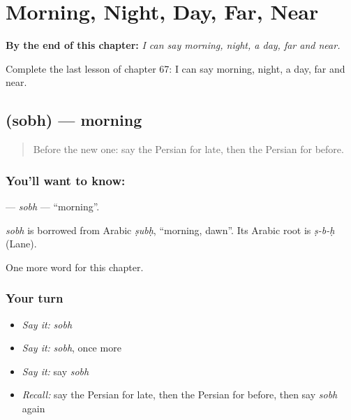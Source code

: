 
\chapter{Morning, Night, Day, Far, Near}
\label{ch:fa-morning-night-day-far-near}

\begin{chapteropening}
\textbf{By the end of this chapter:} \emph{I can say morning, night, a day, far and near.}

Complete the last lesson of chapter 67: I can say morning, night, a day, far and near.
\end{chapteropening}

\section[\texorpdfstring{\fa{صبح} (sobh)}{صبح (sobh)}]{ (sobh) — morning}

\label{lesson:FA-C67-sobh}



\begin{quote}
Before the new one: say the Persian for late, then the Persian for before.
\end{quote}

\subsection*{You'll want to know: }
\textbf{} — \emph{sobh} — \textquotedblleft{}morning\textquotedblright{}.

\begin{cousinweb}
\emph{sobh} is borrowed from Arabic \emph{ṣubḥ}, \textquotedblleft{}morning, dawn\textquotedblright{}. Its Arabic root is \emph{ṣ-b-ḥ} (Lane).
\end{cousinweb}

\begin{grammarlens}[title={What you've built}]
One more word for this chapter.
\end{grammarlens}

\subsection*{Your turn}
\begin{itemize}
\raggedright
  \item \emph{Say it:} \emph{sobh}
  \item \emph{Say it:} \emph{sobh}, once more
  \item \emph{Say it:} say \emph{sobh}
  \item \emph{Recall:} say the Persian for late, then the Persian for before, then say \emph{sobh} again
\end{itemize}

